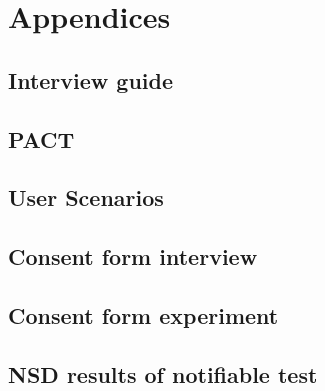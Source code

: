 \chapter{Appendices}

\section{Interview guide}

\section{PACT}

\section{User Scenarios}

\section{Consent form interview}

\section{Consent form experiment}

\section{NSD results of notifiable test}

